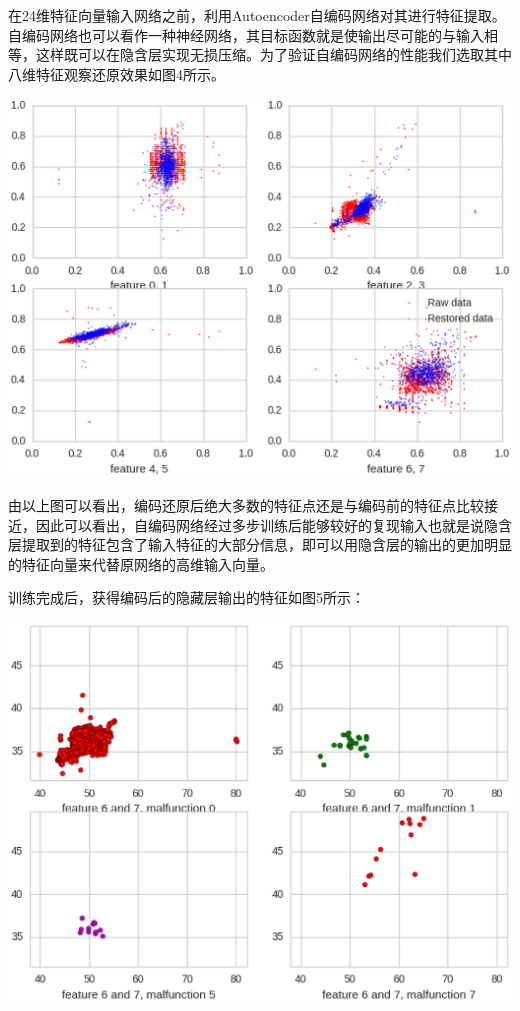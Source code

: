 \documentclass{ctacn}%
\begin{document}
\begin{multicols}{2}
在24维特征向量输入网络之前，利用Autoencoder自编码网络对其进行特征提取。自编码网络也可以看作一种神经网络，其目标函数就是使输出尽可能的与输入相等，这样既可以在隐含层实现无损压缩。为了验证自编码网络的性能我们选取其中八维特征观察还原效果如图4所示。

\begin{center}
	\includegraphics[scale=0.4, trim=0 0 0 0]{figs/autoencoder_restore}\\
	\label{fig5}
\end{center}

由以上图可以看出，编码还原后绝大多数的特征点还是与编码前的特征点比较接近，因此可以看出，自编码网络经过多步训练后能够较好的复现输入也就是说隐含层提取到的特征包含了输入特征的大部分信息，即可以用隐含层的输出的更加明显的特征向量来代替原网络的高维输入向量。

训练完成后，获得编码后的隐藏层输出的特征如图5所示：

\begin{center}
	\includegraphics[scale=0.4, trim=0 0 0 0]{figs/autoencoder_encoded_features}\\
	\label{fig6}
\end{center}


\end{multicols}
\end{document}

